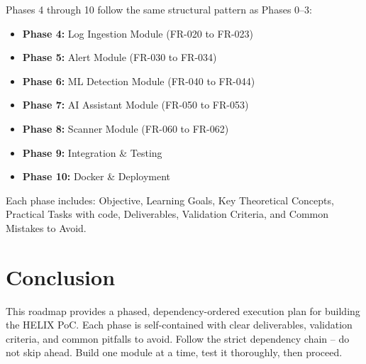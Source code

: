 \documentclass[11pt,a4paper]{report}
\begin{document}
\begin{infobox}[title=Roadmap Continuation]
Phases 4 through 10 follow the same structural pattern as Phases 0--3:
\begin{itemize}
    \item \textbf{Phase 4:} Log Ingestion Module (FR-020 to FR-023)
    \item \textbf{Phase 5:} Alert Module (FR-030 to FR-034)
    \item \textbf{Phase 6:} ML Detection Module (FR-040 to FR-044)
    \item \textbf{Phase 7:} AI Assistant Module (FR-050 to FR-053)
    \item \textbf{Phase 8:} Scanner Module (FR-060 to FR-062)
    \item \textbf{Phase 9:} Integration \& Testing
    \item \textbf{Phase 10:} Docker \& Deployment
\end{itemize}
Each phase includes: Objective, Learning Goals, Key Theoretical Concepts, Practical Tasks with code, Deliverables, Validation Criteria, and Common Mistakes to Avoid.
\end{infobox}

\chapter*{Conclusion}

\begin{infobox}[title=Summary]
This roadmap provides a phased, dependency-ordered execution plan for building the HELIX PoC. Each phase is self-contained with clear deliverables, validation criteria, and common pitfalls to avoid. Follow the strict dependency chain -- do not skip ahead. Build one module at a time, test it thoroughly, then proceed.
\end{infobox}
\end{document}
